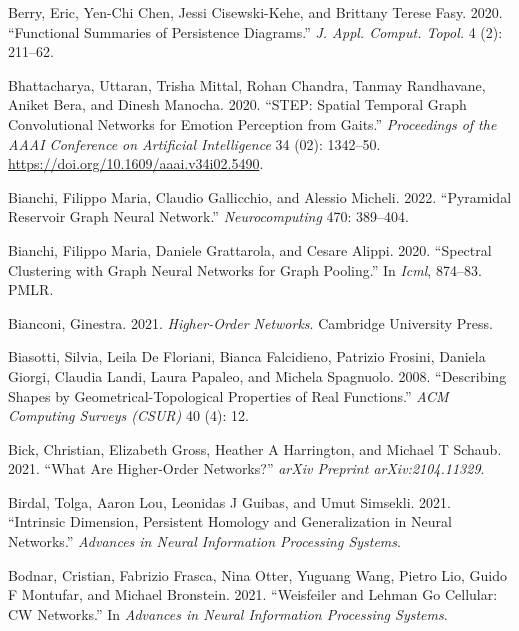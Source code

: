 \documentclass[
  12pt,
]{krantz}
\newlength{\cslhangindent}
\newenvironment{CSLReferences}[2] %
 {\begin{list}{}{%
  \setlength{\itemindent}{0pt}
  \setlength{\leftmargin}{0pt}
  \setlength{\parsep}{0pt}
  \ifodd #1
   \setlength{\leftmargin}{\cslhangindent}
   \setlength{\itemindent}{-1\cslhangindent}
  \fi
  \setlength{\itemsep}{#2\baselineskip}}}
 {\end{list}}
\begin{document}
\begin{CSLReferences}{1}{0}
Berry, Eric, Yen-Chi Chen, Jessi Cisewski-Kehe, and Brittany Terese
Fasy. 2020. {``Functional Summaries of Persistence Diagrams.''} \emph{J.
Appl. Comput. Topol.} 4 (2): 211--62.

Bhattacharya, Uttaran, Trisha Mittal, Rohan Chandra, Tanmay Randhavane,
Aniket Bera, and Dinesh Manocha. 2020. {``{STEP}: Spatial Temporal Graph
Convolutional Networks for Emotion Perception from {G}aits.''}
\emph{Proceedings of the AAAI Conference on Artificial Intelligence} 34
(02): 1342--50. \url{https://doi.org/10.1609/aaai.v34i02.5490}.

Bianchi, Filippo Maria, Claudio Gallicchio, and Alessio Micheli. 2022.
{``Pyramidal Reservoir Graph Neural Network.''} \emph{Neurocomputing}
470: 389--404.

Bianchi, Filippo Maria, Daniele Grattarola, and Cesare Alippi. 2020.
{``Spectral Clustering with Graph Neural Networks for Graph Pooling.''}
In \emph{Icml}, 874--83. PMLR.

Bianconi, Ginestra. 2021. \emph{Higher-Order Networks}. Cambridge
University Press.

Biasotti, Silvia, Leila De Floriani, Bianca Falcidieno, Patrizio
Frosini, Daniela Giorgi, Claudia Landi, Laura Papaleo, and Michela
Spagnuolo. 2008. {``Describing Shapes by Geometrical-Topological
Properties of Real Functions.''} \emph{ACM Computing Surveys (CSUR)} 40
(4): 12.

Bick, Christian, Elizabeth Gross, Heather A Harrington, and Michael T
Schaub. 2021. {``What Are Higher-Order Networks?''} \emph{arXiv Preprint
arXiv:2104.11329}.

Birdal, Tolga, Aaron Lou, Leonidas J Guibas, and Umut Simsekli. 2021.
{``Intrinsic Dimension, Persistent Homology and Generalization in Neural
Networks.''} \emph{Advances in Neural Information Processing Systems}.

Bodnar, Cristian, Fabrizio Frasca, Nina Otter, Yuguang Wang, Pietro Lio,
Guido F Montufar, and Michael Bronstein. 2021. {``Weisfeiler and
{L}ehman Go Cellular: {CW} Networks.''} In \emph{Advances in Neural
Information Processing Systems}.


\end{CSLReferences}
\end{document}
